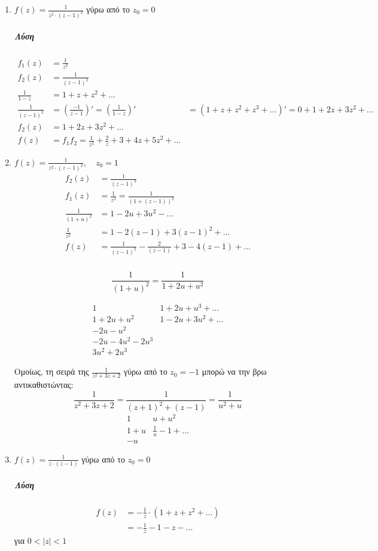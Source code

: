 \documentclass[12pt,a4paper,notitlepage,fleqn]{article}
\begin{document}
\begin{enumerate}
  \item \( f(z) = \frac{1}{z^2\cdot(z-1)^2} \) γύρω από το \( z_0 = 0 \)
  \subparagraph{Λύση}
  \begin{align*}
  f_1(z) &= \frac{1}{z^2} \\
  f_2(z) &= \frac{1}{(z-1)^2} \\
  \frac{1}{1-z} &= 1 + z + z^2 + \dots \\
  \frac{1}{(z-1)^2} &= \left( \frac{-1}{z-1} \right)'
                      = \left( \frac{1}{1-z} \right)'
         &= (1+z+z^2+z^3+\dots)' =
   0+1+2z+3z^2+\dots
  \\ f_2(z) &= 1+2z+3z^2+\dots \\
  f(z) &= f_1f_2 = \frac{1}{z^2} + \frac{2}{z} + 3 + 4z + 5z^2 + \dots
  \end{align*}

  \item \( f(z) = \frac{1}{z^2\cdot(z-1)^2},\quad z_0 = 1 \)
  \begin{align*}
  f_2(z) &= \frac{1}{(z-1)^2} \\
  f_1(z) &= \frac{1}{z^2} = \frac{1}{\left(1+(z-1)\right)^2} \\
  \frac{1}{(1+u)^2} &= 1 - 2u + 3u^2 - \dots \\
  \frac{1}{z^2} &= 1-2(z-1)+3(z-1)^2 + \dots \\
  f(z) &= \frac{1}{(z-1)^2} - \frac{2}{(z-1)} + 3 - 4(z-1) + \dots
  \end{align*}

  \subparagraph{}
  \[
  \frac{1}{(1+u)^2} = \frac{1}{1+2u+u^2}
  \]

  \[
  \begin{array}{l|l}
  1 & 1+2u+u^3 + \dots \\ \hline
  1+2u+u^2 & 1-2u+3u^2+\dots \\
  -2u-u^2 & \\ -2u-4u^2-2u^3 & \\ 3u^2+2u^3
  \end{array}
  \]

  Ομοίως, τη σειρά της \( \frac{1}{z^2+3z+2} \) γύρω από το \( z_0 = -1 \) μπορώ
  να την βρω αντικαθιστώντας:
  \[
  \frac{1}{z^2+3z+2} = \frac{1}{(z+1)^2+(z-1)} = \frac{1}{u^2+u}
  \]\[
  \begin{array}{l|l}
  1 & u+u^2 \\ \hline
  1+u & \frac{1}{u} - 1 + \dots \\
  -u &
  \end{array}
  \]

  \item \( f(z) = \frac{1}{z\cdot(z-1)} \) γύρω από το \( z_0 = 0 \)
  \subparagraph{Λύση}
  \begin{align*}
  f(z) &= -\frac{1}{z}\cdot ( 1+z+z^2+\dots) \\
  &= -\frac{1}{z} - 1 - z - \dots
  \end{align*}
  για \( 0<|z|<1 \)


\end{enumerate}
\end{document}
